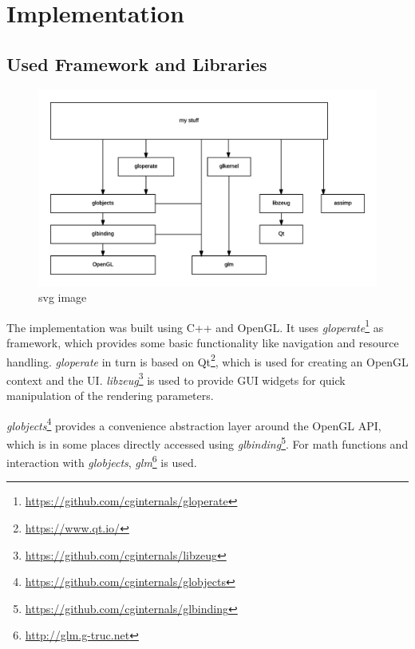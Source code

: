 

\chapter{Implementation}
\label{chap:implementation}


\section{Used Framework and Libraries}

\begin{figure}[htbp]
  \centering
  \includegraphics{graphics/Architecture}
  \caption{svg image}
\end{figure}

The implementation was built using C++ and OpenGL. It uses \textit{gloperate}\footnote{\url{https://github.com/cginternals/gloperate}} as framework, which provides some basic functionality like navigation and resource handling. \textit{gloperate} in turn is based on Qt\footnote{\url{https://www.qt.io/}}, which is used for creating an OpenGL context and the UI. \textit{libzeug}\footnote{\url{https://github.com/cginternals/libzeug}} is used to provide GUI widgets for quick manipulation of the rendering parameters.

\textit{globjects}\footnote{\url{https://github.com/cginternals/globjects}} provides a convenience abstraction layer around the OpenGL API, which is in some places directly accessed using \textit{glbinding}\footnote{\url{https://github.com/cginternals/glbinding}}. For math functions and interaction with \textit{globjects}, \textit{glm}\footnote{\url{http://glm.g-truc.net}} is used.

